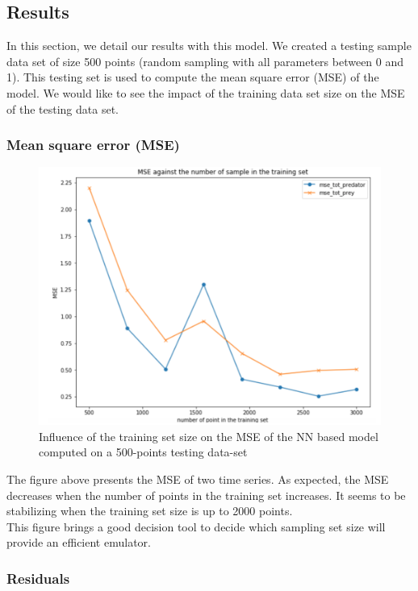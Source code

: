 \documentclass{article}
\begin{document}
\subsection{Results}

In this section, we detail our results with this model. We created a testing sample data set of size 500 points (random sampling with all parameters between 0 and 1). This testing set is used to compute the mean square error (MSE) of the model. We would like to see the impact of the training data set size on the MSE of the testing data set.

\subsubsection{Mean square error (MSE)}

\begin{figure}[H]
\centering
\includegraphics[scale=0.5]{image/mse_NN.png}
\caption{Influence of the training set size on the MSE of the NN based model computed on a 500-points testing data-set}
\label{fig: Signal model}
\end{figure}

The figure above presents the MSE of two time series. As expected, the MSE decreases when the number of points in the training set increases. It seems to be stabilizing when the training set size is up to 2000 points.  \\
This figure brings a good decision tool to decide which sampling set size will provide an efficient emulator. 

\subsubsection{Residuals}
\end{document}
